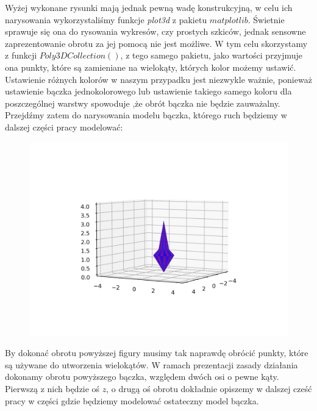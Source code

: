 \documentclass[a4paper,twoside,11pt,reqno]{mwrep}
\theoremstyle{plain} \newtheorem{twr}{Twierdzenie}
\theoremstyle{plain} \newtheorem{lem}{Lemat}
\theoremstyle{definition} \newtheorem{defi}{Definicja}
\theoremstyle{remark} \newtheorem*{wni}{Wniosek}
\theoremstyle{definition} \newtheorem{uwaga}{Uwaga}
\theoremstyle{definition}\newtheorem{prz}{Przykład}
\begin{document}
Wyżej wykonane rysunki mają jednak pewną wadę konstrukcyjną, w celu ich narysowania wykorzystaliśmy funkcje 
\textit{plot3d} z pakietu $matplotlib$. Świetnie sprawuje się ona do rysowania wykresów, czy prostych szkiców, jednak
sensowne zaprezentowanie obrotu za jej pomocą nie jest możliwe. W tym celu skorzystamy z funkcji $Poly3DCollection()$,
z tego samego pakietu, jako wartości przyjmuje ona punkty, które są zamieniane na wielokąty, 
których kolor możemy ustawić. Ustawienie różnych kolorów w naszym przypadku jest niezwykle ważnie,
ponieważ ustawienie bączka jednokolorowego lub ustawienie takiego samego koloru dla poszczególnej warstwy spowoduje
,że obrót bączka nie będzie zauważalny. Przejdźmy zatem do narysowania modelu bączka, którego ruch będziemy w dalszej
części pracy modelować: 
\begin{figure}[h]
\begin{center}
\includegraphics[width=10 cm]{top_0.png}
\end{center}
\end{figure}

By dokonać obrotu powyższej figury musimy tak naprawdę obrócić punkty, które są używane do utworzenia wielokątów.
W ramach prezentacji zasady działania dokonamy obrotu powyższego bączka, względem dwóch osi o pewne kąty. 
Pierwszą z nich będzie oś $z$, o drugą oś obrotu dokładnie opiszemy w dalszej cześć pracy w części
gdzie będziemy modelować ostateczny model bączka.
\end{document}
